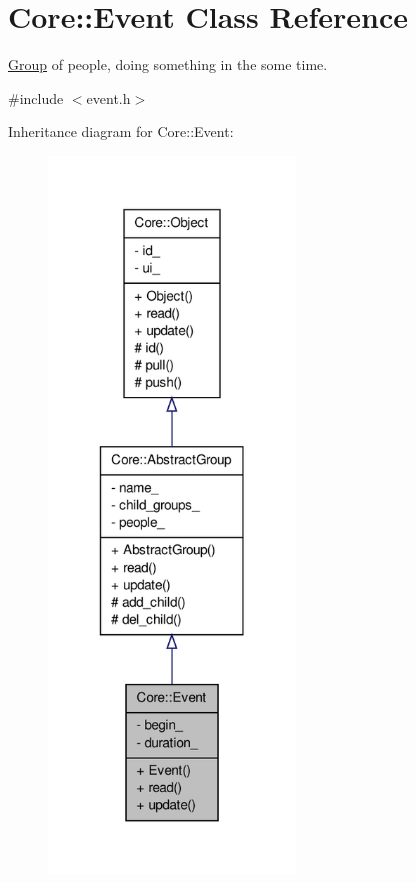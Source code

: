 \hypertarget{classCore_1_1Event}{
\section{Core::Event Class Reference}
\label{d9/d42/classCore_1_1Event}
}


\hyperlink{classCore_1_1Group}{Group} of people, doing something in the some time.  




{\ttfamily \#include $<$event.h$>$}



Inheritance diagram for Core::Event:
\nopagebreak
\begin{figure}[H]
\begin{center}
\leavevmode
\includegraphics[width=186pt]{d2/d0e/classCore_1_1Event__inherit__graph}
\end{center}
\end{figure}


